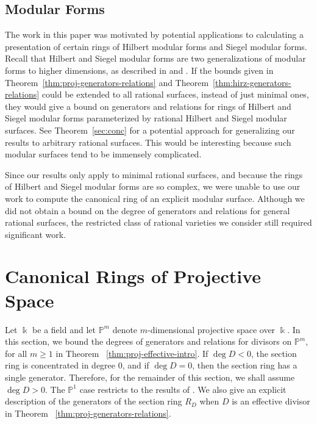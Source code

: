 \documentclass{amsart}
\theoremstyle{plain}
\theoremstyle{definition}
\theoremstyle{remark}
\numberwithin{equation}{subsection}
\newcommand\bp{{\mathbb P}}
\newcommand\bk{{\Bbbk}}
\begin{document}
\subsection{Modular Forms}
\label{subsection:modular-forms}
The work in this paper was motivated by 
potential applications to
calculating a presentation of certain rings of
Hilbert 
modular forms and Siegel modular forms. 
Recall that Hilbert and Siegel 
modular forms are two generalizations of modular forms to higher dimensions,
as described in \cite{geer:siegel-modular} and \cite{bruinier:hilbert-modular}.
If the bounds given in 
Theorem~\ref{thm:proj-generators-relations} and Theorem~\ref{thm:hirz-generators-relations}
could be extended to all rational surfaces, instead of just minimal ones,
they would give a bound on generators and relations for 
rings of Hilbert and Siegel modular forms parameterized by rational
Hilbert and Siegel modular surfaces.
See Theorem~\ref{sec:conc} for a potential approach for generalizing our results to arbitrary rational surfaces.
This would be interesting because such modular surfaces tend to be
immensely complicated. 

Since our results only apply to minimal rational surfaces, and because the rings of Hilbert and Siegel modular forms are so complex, we were unable
to use our work to compute the canonical ring of an explicit modular surface.
Although we did not obtain a bound on the degree of generators and relations
for general rational surfaces, the restricted class of rational varieties we consider still required significant work.


\section{Canonical Rings of Projective Space}
\label{sec:proj}
Let $\bk$ be a field and let $\bp^m$ denote $m$-dimensional
projective space over $\bk$. In this section, we bound the degrees
of generators and relations for divisors
on $\bp^m$, for all $m \geq 1$ in Theorem
~\ref{thm:proj-effective-intro}.
If $\deg D < 0$, the
section ring is concentrated in degree 0, and if
$\deg D = 0$, then the section ring has a single
generator. Therefore, for the remainder of this section,
we shall assume $\deg D > 0$.
The $\bp^1$ case restricts to the results of
\cite{dorney:canonical}. We also give an explicit description of the
generators of the section ring $R_D$ when $D$ is an effective divisor in Theorem ~\ref{thm:proj-generators-relations}.
\end{document}

